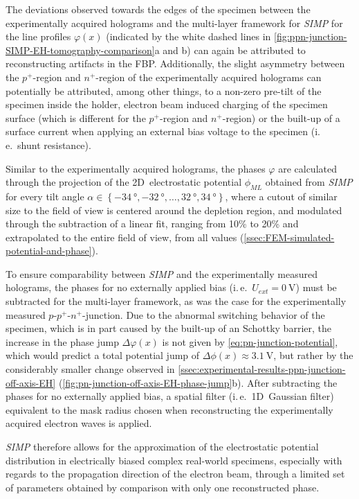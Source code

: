 The deviations observed towards the edges of the specimen between the experimentally acquired holograms and the multi-layer framework for \emph{SIMP} for the line profiles $\varphi\left(x\right)$ (indicated by the white dashed lines in \cref{fig:ppn-junction-SIMP-EH-tomography-comparison}a and b) can again be attributed to reconstructing artifacts in the FBP. Additionally, the slight asymmetry between the $p^+$-region and $n^+$-region of the experimentally acquired holograms can potentially be attributed, among other things, to a non-zero pre-tilt of the specimen inside the holder, electron beam induced charging of the specimen surface (which is different for the $p^+$-region and $n^+$-region) or the built-up of a surface current when applying an external bias voltage to the specimen (i.\,e.\ shunt resistance).

Similar to the experimentally acquired holograms, the phases $\varphi$ are calculated through the projection of the 2D~electrostatic potential $\phi_{\mathit{ML}}$ obtained from \emph{SIMP} for every tilt angle $\alpha \in \left\{\SI{-34}{\degree}, \SI{-32}{\degree}, \dots , \SI{+32}{\degree}, \SI{+34}{\degree}\right\}$, where a cutout of similar size to the field of view is centered around the depletion region, and modulated through the subtraction of a linear fit, ranging from 10\% to 20\% and extrapolated to the entire field of view, from all values (\cref{ssec:FEM-simulated-potential-and-phase}).

To ensure comparability between \emph{SIMP} and the experimentally measured holograms, the phases for no externally applied bias (i.\,e.\ $U_{\mathit{ext}} = \SI{0}{\volt}$) must be subtracted for the multi-layer framework, as was the case for the experimentally measured $p$-$p^+$-$n^+$-junction. Due to the abnormal switching behavior of the specimen, which is in part caused by the built-up of an Schottky barrier, the increase in the phase jump $\Delta \varphi\left(x\right)$ is not given by \cref{eq:pn-junction-potential}, which would predict a total potential jump of $\Delta \phi\left(x\right) \approx \SI{3.1}{\volt}$, but rather by the considerably smaller change observed in \cref{ssec:experimental-results-ppn-junction-off-axis-EH} (\cref{fig:pn-junction-off-axis-EH-phase-jump}b). After subtracting the phases for no externally applied bias, a spatial filter (i.\,e.\ 1D~Gaussian filter) equivalent to the mask radius chosen when reconstructing the experimentally acquired electron waves is applied.

\emph{SIMP} therefore allows for the approximation of the electrostatic potential distribution in electrically biased complex real-world specimens, especially with regards to the propagation direction of the electron beam, through a limited set of parameters obtained by comparison with only one reconstructed phase.
